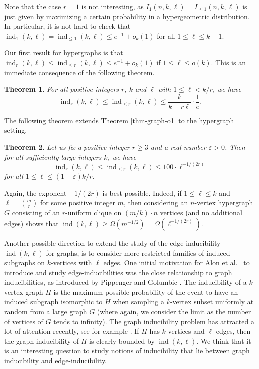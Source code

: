 \documentclass[11pt]{article}
\newtheorem{theorem}{Theorem}[section]
\theoremstyle{definition}
\numberwithin{equation}{section}
\begin{document}
Note that the case $r=1$ is not interesting, as $I_1(n,k,\ell)=I_{\leq 1}(n,k,\ell)$ is just given by maximizing a certain probability in a hypergeometric distribution. In particular, it is not hard to check that $\operatorname{ind}_1(k,\ell)= \operatorname{ind}_{\leq 1}(k,\ell)\leq e^{-1}+o_k(1)$ for all $1\leq \ell\leq k-1$.

Our first result for hypergraphs is that $\operatorname{ind}_r(k,\ell)\leq \operatorname{ind}_{\leq r}(k,\ell)\leq e^{-1}+o_k(1)$ if $1\leq \ell\leq o(k)$. This is an immediate consequence of the following theorem.

\begin{theorem}\label{thm-hyper-1-e}For all positive integers $r$, $k$ and $\ell$ with $1\leq \ell< k/r$, we have
\[\operatorname{ind}_r(k,\ell)\leq \operatorname{ind}_{\leq r}(k,\ell)\leq \frac{k}{k-r\ell}\cdot \frac{1}{e}.\]
\end{theorem}

The following theorem extends Theorem \ref{thm-graph-o1} to the hypergraph setting.

\begin{theorem}\label{thm-hyper-o1}Let us fix a positive integer $r\geq 3$ and a real number $\varepsilon>0$. Then for all sufficiently large integers $k$, we have
\[\operatorname{ind}_r(k,\ell)\leq\operatorname{ind}_{\leq r}(k,\ell)\leq 100\cdot \ell^{-1/(2r)}\]
for all $1\leq \ell\leq (1-\varepsilon)k/r$.
\end{theorem}

Again, the exponent $-1/(2r)$ is best-possible. Indeed, if $1\leq \ell\leq k$ and $\ell={m\choose r}$ for some positive integer $m$, then considering an $n$-vertex hypergraph $G$ consisting of an $r$-uniform clique on $(m/k)\cdot n$ vertices (and no additional edges) shows that $\operatorname{ind}(k,\ell)\geq \Omega(m^{-1/2})=\Omega(\ell^{-1/(2r)})$.

Another possible direction to extend the study of the edge-inducibility $\operatorname{ind}(k,\ell)$ for graphs, is to consider more restricted families of induced subgraphs on $k$-vertices with $\ell$ edges. One initial motivation for Alon et al.\ \cite{alon-et-al} to introduce and study edge-inducibilities was the close relationship to graph inducibilities, as introduced by Pippenger and Golumbic \cite{pippenger-golumbic}. The inducibility of a $k$-vertex graph $H$ is the maximum possible probability of the event to have an induced subgraph isomorphic to $H$ when sampling a $k$-vertex subset uniformly at random from a large graph $G$ (where again, we consider the limit as the number of vertices of $G$ tends to infinity). The graph inducibility problem has attracted a lot of attention recently, see for example \cite{balogh-hu-lidicky-pfender, hefetz-tyomkyn, kral-norin-volec, yuster}. If $H$ has $k$ vertices and $\ell$ edges, then the graph inducibility of $H$ is clearly bounded by $\operatorname{ind}(k,\ell)$. We think that it is an interesting question to study notions of inducibility that lie between graph inducibility and edge-inducibility.
\end{document}

